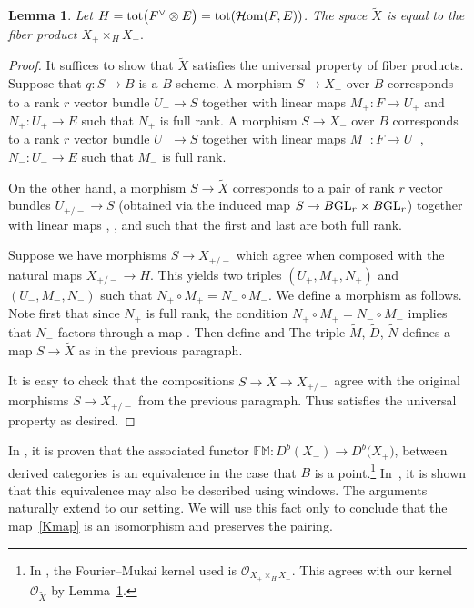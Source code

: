 \documentclass[pdftex]{sigma}
\newtheorem{Lemma}[Theorem]{Lemma}
\numberwithin{equation}{section}
\newcommand{\cc}[1]{\mathcal{#1}} %
\DeclareMathOperator{\tot}{tot}
\begin{document}
\begin{Lemma}\label{l:FP} Let $H = \tot\bigl(F^\vee \otimes E\bigr) = \tot( \mathcal{H}{\rm om}(F, E) )$.
 The space $\tilde X$ is equal to the fiber product
 $X_+ \times_H X_-.$
\end{Lemma}
\begin{proof}
 It suffices to show that $\tilde X$ satisfies the universal property of fiber products. Suppose that $q\colon S \to B$ is a $B$-scheme. A morphism $S \to X_+$ over $B$ corresponds to a rank $r$ vector bundle $U_+ \to S$ together with linear maps $M_+\colon F \to U_+$ and $N_+\colon U_+ \to E$ such that $N_+$ is full rank. A morphism $S \to X_-$ over $B$ corresponds to a rank $r$ vector bundle $U_- \to S$ together with linear maps $M_-\colon F \to U_-$, $N_-\colon U_- \to E$ such that $M_-$ is full rank.

 On the other hand, a morphism $S \to \tilde X$ corresponds to a pair of rank $r$ vector bundles $U_{+/-} \to S$ (obtained via the induced map $S \to B{\rm GL}_r \times B{\rm GL}_r$) together with linear maps
 , , and  such that the first and last are both full rank.

 Suppose we have morphisms $S \to X_{+/-}$ which agree when composed with the natural maps $X_{+/-} \to H$.
 This yields two triples $(U_+, M_+, N_+)$ and $(U_-, M_-, N_-)$ such that $N_+ \circ M_+ = N_- \circ M_-$.
 We define a morphism  as follows.
 Note first that since $N_+$ is full rank, the condition $N_+ \circ M_+ = N_- \circ M_-$ implies that $N_-$ factors through a map . Then define  and  The triple $\tilde M$, $\tilde D$, $\tilde N$ defines a map $S \to \tilde X$ as in the previous paragraph.

It is easy to check that the compositions $S \to \tilde X \to X_{+/-}$ agree with the original morphisms $S \to X_{+/-}$ from the previous paragraph. Thus  satisfies the universal property as desired.
\end{proof}

In \cite[Theorem~D]{BLV}, it is proven that the
associated functor $\mathbb{FM}\colon D^b(X_-) \to D^b\bigl(X_+\bigr)$, between derived categories is an equivalence in the case that $B$ is a point.\footnote{In \cite{BLV}, the Fourier--Mukai kernel used is $\cc O_{X_+ \times_H X_-}$. This agrees with our kernel $\cc O_{\tilde X}$ by Lemma~\ref{l:FP}.} In~\cite{BCFMV}, it is shown that this equivalence may also be described using windows. The arguments naturally extend to our setting. We will use this fact only to conclude that the map~\eqref{Kmap} is an isomorphism and preserves the pairing.
\end{document}

